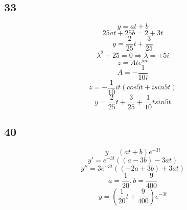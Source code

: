 \documentclass[12pt, a4paper]{IEEEtran}
\begin{document}
    \subsection{33}
    $$y=at+b$$
    $$25at+25b=2+3t$$
    $$y=\frac{2}{25}t+\frac{3}{25}$$
    $$\lambda^2+25=0\Rightarrow \lambda=\pm 5i$$
    $$z=Ate^{5it}$$
    $$A=-\frac{1}{10i}$$
    $$z=-\frac{1}{10}it(cos5t+isin5t)$$
    $$y=\frac{2}{25}t+\frac{3}{25}+\frac{1}{10}tsin5t$$

    \subsection{40}
    $$y=(at+b)e^{-3t}$$
    $$y'=e^{-3t}((a-3b)-3at)$$
    $$y''=3e^{-3t}((-2a+3b)+3at)$$
    $$a=\frac{1}{20}, b=\frac{9}{400}$$
    $$y=(\frac{1}{20}t+\frac{9}{400})e^{-3t}$$
    
\end{document}
